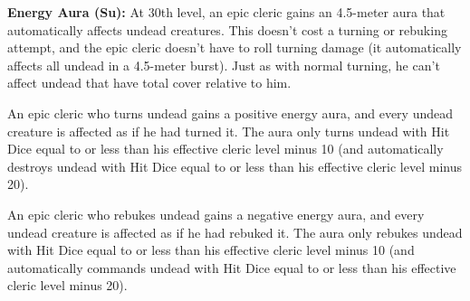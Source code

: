 
\textbf{Energy Aura (Su):} At 30th level, an epic cleric gains an 4.5-meter aura that automatically affects undead creatures. This doesn't cost a turning or rebuking attempt, and the epic cleric doesn't have to roll turning damage (it automatically affects all undead in a 4.5-meter burst). Just as with normal turning, he can't affect undead that have total cover relative to him.

An epic cleric who turns undead gains a positive energy aura, and every undead creature is affected as if he had turned it. The aura only turns undead with Hit Dice equal to or less than his effective cleric level minus 10 (and automatically destroys undead with Hit Dice equal to or less than his effective cleric level minus 20).

An epic cleric who rebukes undead gains a negative energy aura, and every undead creature is affected as if he had rebuked it. The aura only rebukes undead with Hit Dice equal to or less than his effective cleric level minus 10 (and automatically commands undead with Hit Dice equal to or less than his effective cleric level minus 20).
